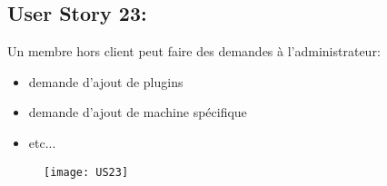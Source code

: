 \newpage
\subsection{User Story 23:}
Un membre hors client peut faire des demandes à l'administrateur:

\begin{itemize}
  \item demande d'ajout de plugins
  \item demande d'ajout de machine spécifique
  \item etc...
\end{itemize}



\begin{figure}[!h]
  \begin{center}
        \texttt{[image: US23]}
        \label{US23-dia}
  \end{center}
\end{figure}